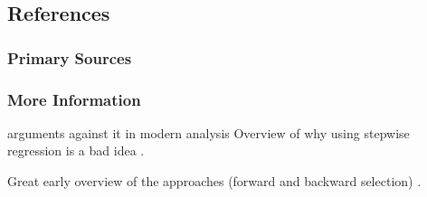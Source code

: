 




\subsection{References}

\subsubsection{Primary Sources}



\subsubsection{More Information}

arguments against it in modern analysis
Overview of why using stepwise regression is a bad idea \cite{Whittingham2006}.
\cite{Mundry2009}

Great early overview of the approaches (forward and backward selection) \cite{Hocking1976}.



